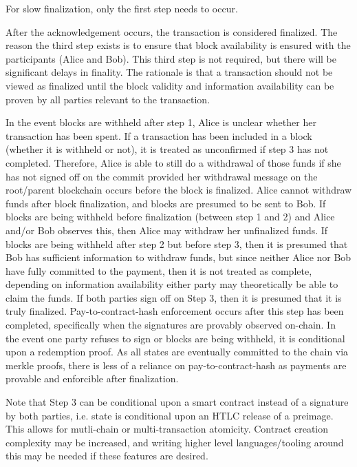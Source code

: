 \documentclass[letterpaper, 11pt]{article}
\begin{document}
For slow finalization, only the first step needs to occur.

After the acknowledgement occurs, the transaction is considered finalized. The
reason the third step exists is to ensure that block availability is ensured
with the participants (Alice and Bob). This third step is not required, but
there will be significant delays in finality. The rationale is that a
transaction should not be viewed as finalized until the block validity and
information availability  can be proven by all parties relevant to the
transaction.

In the event blocks are withheld after step 1, Alice is unclear whether her
transaction has been spent. If a transaction has been included in a block
(whether it is withheld or not), it is treated as unconfirmed if step 3 has not
completed. Therefore, Alice is able to still do a withdrawal of those funds if
she has not signed off on the commit provided her withdrawal message on the
root/parent blockchain occurs before the block is finalized. Alice cannot
withdraw funds after block finalization, and blocks are presumed to be sent to
Bob. If blocks are being withheld before finalization (between step 1 and 2) and
Alice and/or Bob observes this, then Alice may withdraw her unfinalized funds.
If blocks are being withheld after step 2 but before step 3, then it is presumed
that Bob has sufficient information to withdraw funds, but since neither Alice
nor Bob have fully committed to the payment, then it is not treated as complete,
depending on information availability either party may theoretically be able to
claim the funds. If both parties sign off on Step 3, then it is presumed that it
is truly finalized. Pay-to-contract-hash\cite{paytocontract} enforcement occurs
after this step has been completed, specifically when the signatures are
provably observed on-chain. In the event one party refuses to sign or blocks
are being withheld, it is conditional upon a redemption proof. As all states
are eventually committed to the chain via merkle proofs, there is less of a
reliance on pay-to-contract-hash as payments are provable and enforcible after
finalization.

Note that Step 3 can be conditional upon a smart contract instead of a signature
by both parties, i.e. state is conditional upon an HTLC release of a preimage.
This allows for mutli-chain or multi-transaction atomicity. Contract creation
complexity may be increased, and writing higher level languages/tooling around
this may be needed if these features are desired.
\end{document}
